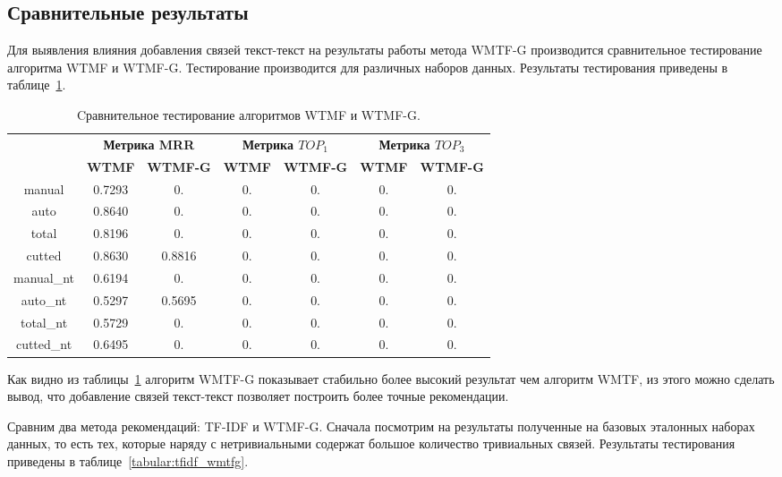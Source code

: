\subsection{Сравнительные результаты}
    Для выявления влияния добавления связей текст-текст на результаты работы метода WMTF-G производится сравнительное тестирование алгоритма WTMF и WTMF-G. Тестирование производится для различных наборов данных.
    Результаты тестирования приведены в таблице~\ref{tabular:wtmf_wmtfg}.

    \begin{table}[h!]
    \caption{Cравнительное тестирование алгоритмов WTMF и WTMF-G. \bigskip}
    \centering

    \label{tabular:wtmf_wmtfg}
        \begin{tabular}{|c|c|c|c|c|c|c|}
            \hline
            \bf{\multirow{2}{*}{\specialcell{Набор данных}}} &
            \multicolumn{2}{|c|}{\bf{Метрика MRR}} &
            \multicolumn{2}{|c|}{\bf{Метрика $TOP_1$}} &
            \multicolumn{2}{|c|}{\bf{Метрика $TOP_3$}} \\ \cline{2-7}
            & \bf{WTMF} & \bf{WTMF-G} & \bf{WTMF} & \bf{WTMF-G} & \bf{WTMF} & \bf{WTMF-G} \\ \hline
            manual & 0.7293 & 0. & 0. & 0. & 0. & 0. \\ \hline
            auto & 0.8640 & 0. & 0. & 0. & 0. & 0. \\ \hline
            total & 0.8196 & 0. & 0. & 0. & 0. & 0. \\ \hline
            cutted & 0.8630 & 0.8816 & 0. & 0. & 0. & 0. \\ \hline
            manual\_nt & 0.6194 & 0. & 0. & 0. & 0. & 0. \\ \hline
            auto\_nt & 0.5297 & 0.5695 & 0. & 0. & 0. & 0. \\ \hline
            total\_nt & 0.5729 & 0. & 0. & 0. & 0. & 0. \\ \hline
            cutted\_nt & 0.6495 & 0. & 0. & 0. & 0. & 0. \\ \hline
        \end{tabular}
    \end{table}

    Как видно из таблицы~\ref{tabular:wtmf_wmtfg} алгоритм WMTF-G показывает стабильно более высокий результат чем алгоритм WMTF, из этого можно сделать вывод, что добавление связей текст-текст позволяет построить более точные рекомендации.

    Сравним два метода рекомендаций: TF-IDF и WTMF-G. Сначала посмотрим на результаты полученные на 
    базовых эталонных наборах данных, то есть тех, которые наряду с нетривиальными содержат большое количество тривиальных связей.
    Результаты тестирования приведены в таблице~\ref{tabular:tfidf_wmtfg}.

